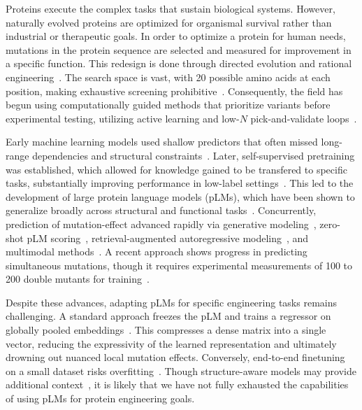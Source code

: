 \documentclass[sn-nature]{sn-jnl}
\begin{document}
Proteins execute the complex tasks that sustain biological systems. However, naturally evolved proteins are optimized for organismal survival rather than industrial or therapeutic goals. In order to optimize a protein for human needs, mutations in the protein sequence are selected and measured for improvement in a specific function. This redesign is done through directed evolution and rational engineering~\cite{packer2015methods, selzer2000rational, wang2021rational, yang2019machine}. The search space is vast, with 20 possible amino acids at each position, making exhaustive screening prohibitive~\cite{wu2019machine, barrozo2012computational}. Consequently, the field has begun using computationally guided methods that prioritize variants before experimental testing, utilizing active learning and low-$N$ pick-and-validate loops~\cite{yang2025active, chu2024accurate}.

Early machine learning models used shallow predictors that often missed long-range dependencies and structural constraints~\cite{wu2019machine, yang2019machine}. Later, self-supervised pretraining was established, which allowed for knowledge gained to be transfered to specific tasks, substantially improving performance in low-label settings~\cite{rao2019evaluating}. This led to the development of large protein language models (pLMs), which have been shown to generalize broadly across structural and functional tasks~\cite{lin2022language, hayes2025simulating, fournier2024protein}. Concurrently, prediction of mutation-effect advanced rapidly via generative modeling~\cite{riesselman2018deep}, zero-shot pLM scoring~\cite{meier2021language, jiang2024rapid}, retrieval-augmented autoregressive modeling~\cite{notin2022tranception, notin2022trancepteve}, and multimodal methods~\cite{cheng2024zero, su2023saprot, heinzinger2024bilingual, ouyang2024distilling}. A recent approach shows progress in predicting simultaneous mutations, though it requires experimental measurements of 100 to 200 double mutants for training~\cite{tran2026rapid}.

Despite these advances, adapting pLMs for specific engineering tasks remains challenging. A standard approach freezes the pLM and trains a regressor on globally pooled embeddings~\cite{jiang2024rapid, jawaid2023improving}. This compresses a dense matrix into a single vector, reducing the expressivity of the learned representation and ultimately drowning out nuanced local mutation effects. Conversely, end-to-end finetuning on a small dataset risks overfitting~\cite{hua2025improving}. Though structure-aware models may provide additional context~\cite{goverde2023computational, shroff2020discovery}, it is likely that we have not fully exhausted the capabilities of using pLMs for protein engineering goals.
\end{document}
